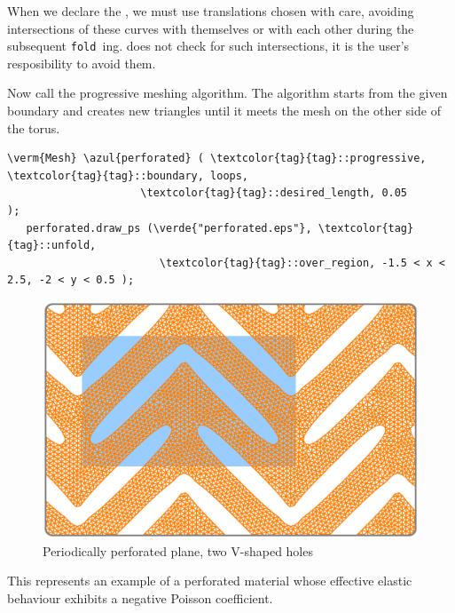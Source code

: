 When we declare the {\small\tt{}}, we must use translations chosen with care,
avoiding intersections of these curves with themselves or with each other during the subsequent
{\small\tt fold\,}ing.
\ManiFEM{} does not check for such intersections, it is the user's resposibility to avoid them.

Now call the progressive meshing algorithm.
The algorithm starts from the given boundary and creates new triangles until
it meets the mesh on the other side of the torus.

\begin{Verbatim}[commandchars=\\\{\},formatcom=\small\tt,frame=single,
   label=code not working,rulecolor=\color{coment},
   baselinestretch=0.94,framesep=2mm                                   ]
   \verm{Mesh} \azul{perforated} ( \textcolor{tag}{tag}::progressive, \textcolor{tag}{tag}::boundary, loops,
                     \textcolor{tag}{tag}::desired_length, 0.05              );
   perforated.draw_ps (\verde{"perforated.eps"}, \textcolor{tag}{tag}::unfold,
                        \textcolor{tag}{tag}::over_region, -1.5 < x < 2.5, -2 < y < 0.5 );
\end{Verbatim}

\begin{figure}[ht] \centering
  \includegraphics[width=120mm]{boomerang-3.eps}
  \caption{Periodically perforated plane, two V-shaped holes}
  \label{\numb section 7.\numb fig 14}
\end{figure}

This represents an example of a perforated material whose effective elastic behaviour
exhibits a negative Poisson coefficient.
